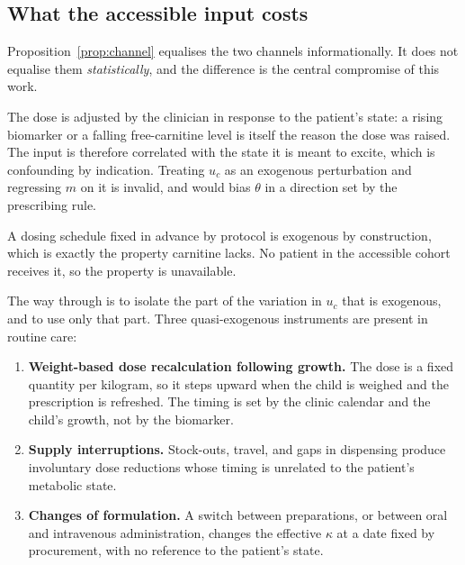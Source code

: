 \subsection{What the accessible input costs}
\label{sec:instruments}

Proposition~\ref{prop:channel} equalises the two channels informationally. It does not
equalise them \emph{statistically}, and the difference is the central compromise of this
work.

\begin{description}[leftmargin=1.4em, itemsep=3pt]
\item[Carnitine is available but endogenous.] The dose is adjusted by the clinician in
response to the patient's state: a rising biomarker or a falling free-carnitine level is
itself the reason the dose was raised. The input is therefore correlated with the state it
is meant to excite, which is confounding by indication. Treating $u_c$ as an exogenous
perturbation and regressing $m$ on it is invalid, and would bias $\theta$ in a direction
set by the prescribing rule.
\item[The therapy would be exogenous but is absent.] A dosing schedule fixed in advance by
protocol is exogenous by construction, which is exactly the property carnitine lacks. No
patient in the accessible cohort receives it, so the property is unavailable.
\end{description}

The way through is to isolate the part of the variation in $u_c$ that is exogenous, and to
use only that part. Three quasi-exogenous instruments are present in routine care:

\begin{enumerate}[leftmargin=*, itemsep=2pt]
\item \textbf{Weight-based dose recalculation following growth.} The dose is a fixed
      quantity per kilogram, so it steps upward when the child is weighed and the
      prescription is refreshed. The timing is set by the clinic calendar and the child's
      growth, not by the biomarker.
\item \textbf{Supply interruptions.} Stock-outs, travel, and gaps in dispensing produce
      involuntary dose reductions whose timing is unrelated to the patient's metabolic
      state.
\item \textbf{Changes of formulation.} A switch between preparations, or between oral and
      intravenous administration, changes the effective $\kappa$ at a date fixed by
      procurement, with no reference to the patient's state.
\end{enumerate}

